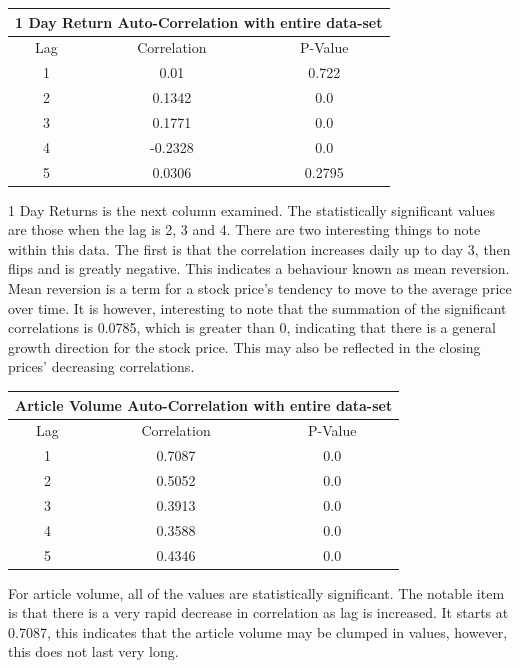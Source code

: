 \begin{center}
\begin{tabular}{ c c c }
\hline
\multicolumn{3}{|c|}{1 Day Return Auto-Correlation with entire data-set} \\
\hline
Lag & Correlation & P-Value \\
\hline
1 & 0.01 & 0.722 \\
2 & 0.1342 & 0.0 \\
3 & 0.1771 & 0.0 \\
4 & -0.2328 & 0.0 \\
5 & 0.0306 & 0.2795 \\
\end{tabular}
\end{center}
1 Day Returns is the next column examined. The statistically significant values are those when the lag is 2, 3 and 4. There are two interesting things to note within this data. The first is that the correlation increases daily up to day 3, then flips and is greatly negative. This indicates a behaviour known as mean reversion. Mean reversion is a term for a stock price's tendency to move to the average price over time. It is however, interesting to note that the summation of the significant correlations is 0.0785, which is greater than 0, indicating that there is a general growth direction for the stock price. This may also be reflected in the closing prices' decreasing correlations.

\begin{center}
\begin{tabular}{ c c c }
\hline
\multicolumn{3}{|c|}{Article Volume Auto-Correlation with entire data-set} \\
\hline
Lag & Correlation & P-Value \\
\hline
1 & 0.7087 & 0.0 \\
2 & 0.5052 & 0.0 \\
3 & 0.3913 & 0.0 \\
4 & 0.3588 & 0.0 \\
5 & 0.4346 & 0.0 \\
\end{tabular}
\end{center}
For article volume, all of the values are statistically significant. The notable item is that there is a very rapid decrease in correlation as lag is increased. It starts at 0.7087, this indicates that the article volume may be clumped in values, however, this does not last very long.


